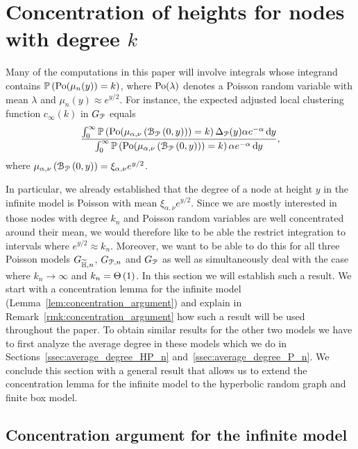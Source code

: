 \section{Concentration of heights for nodes with degree $k$}\label{sec:concentration_argument}

Many of the computations in this paper will involve integrals whose integrand contains $\mathbb{P}\left({\mathrm{Po}}(\mu_n(y)) = k\right)$, where ${\mathrm{Po}}(\lambda)$ denotes a Poisson random variable with mean $\lambda$ and $\mu_n(y) \approx e^{y/2}$. For instance, the expected adjusted local clustering function $c_\infty(k)$ in $G_{{\mathcal P}}$ equals
\[
	\frac{\int_0^\infty \mathbb{P}\left({\mathrm{Po}}(\mu_{\alpha,\nu}\left({\mathcal B}_{{\mathcal P}}\left(0,y\right)\right)) = k\right) \Delta_{{\mathcal P}}(y) \alpha e^{-\alpha} \operatorname{\mathrm{d}\hspace{-2pt}} y}
	{\int_0^\infty \mathbb{P}\left({\mathrm{Po}}(\mu_{\alpha,\nu}\left({\mathcal B}_{{\mathcal P}}\left(0,y\right)\right)) = k\right) \alpha e^{-\alpha} \operatorname{\mathrm{d}\hspace{-2pt}} y},
\]
where $\mu_{\alpha,\nu}\left({\mathcal B}_{{\mathcal P}}\left(0,y\right)\right) = \xi_{\alpha,\nu} e^{y/2}$. 

In particular, we already established that the degree of a node at height $y$ in the infinite model is Poisson with mean $\xi_{\alpha,\nu} e^{y/2}$. Since we are mostly interested in those nodes with degree $k_n$ and Poisson random variables are well concentrated around their mean, we would therefore like to be able the restrict integration to intervals where $e^{y/2} \approx k_n$. Moreover, we want to be able to do this for all three Poisson models $G_{\widetilde{\mathbb{H}},n}$, $G_{{\mathcal P},n}$ and $G_{{\mathcal P}}$ as well as simultaneously deal with the case where $k_n \to \infty$ and $k_n = \Theta\left(1\right)$. In this section we will establish such a result. We start with a concentration lemma for the infinite model (Lemma~\ref{lem:concentration_argument}) and explain in Remark~\ref{rmk:concentration_argument} how such a result will be used throughout the paper. To obtain similar results for the other two models we have to first analyze the average degree in these models which we do in Sections~\ref{ssec:average_degree_HP_n} and~\ref{ssec:average_degree_P_n}. We conclude this section with a general result that allows us to extend the concentration lemma for the infinite model to the hyperbolic random graph and finite box model. 

\subsection{Concentration argument for the infinite model}

